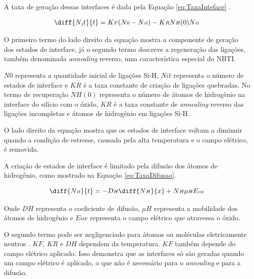 A taxa de geração dessas interfaces é dada pela Equação \ref{eq:TaxaInteface} \cite{Lorenz}.

\begin{equation}
    \label{eq:TaxaInteface}
    \diff{N{\textsubscript it}}{t} = K{\scriptstyle F}(N{\scriptstyle 0} - N{\scriptstyle it}) - K{\scriptstyle R}N{\scriptstyle H}(0)N{\scriptstyle it}
\end{equation}

O primeiro termo do lado direito da equação mostra a componente de geração dos estados de interface, já o segundo termo descreve a regeneração das ligações, também denominada \textit{annealing} reverso, uma característica especial do NBTI.

$N\scriptstyle{0}$ representa a quantidade inicial de ligações Si-H, $N\scriptstyle{it}$ representa o número de estados de interface e $K\scriptstyle{R}$ é a taxa constante de criação de ligações quebradas. No termo de recuperação $N\scriptstyle{H}(0)$ representa o número de átomos de hidrogênio na interface do silício com o óxido, $K\scriptstyle{R}$ é a taxa constante de \textit{annealing} reverso das ligações incompletas e átomos de hidrogênio em ligações Si-H.

O lado direito da equação mostra que os estados de interface voltam a diminuir quando a condição de estresse, causada pela alta temperatura e o campo elétrico, é removida.

A criação de estados de interface é limitado pela difusão dos átomos de hidrogênio, como mostrado na Equação \ref{eq:TaxaDifusao}.

\begin{equation}
    \label{eq:TaxaDifusao}
    \diff{N{\scriptstyle it}}{t} = - D{\scriptstyle H}\diff{N{\scriptstyle H}}{x} + N{\scriptstyle H}\mu{\scriptstyle H}E{\scriptstyle ox}
\end{equation}

Onde $D\scriptstyle{H}$ representa o coeficiente de difusão, $\mu\scriptstyle{H}$ representa a mobilidade dos átomos de hidrogênio e $E\scriptstyle{ox}$ representa o campo elétrico que atravessa o óxido.

O segundo termo pode ser negligenciado para átomos ou moléculas eletricamente neutros \cite{Lorenz}. $K\scriptstyle{F}$, $K\scriptstyle{R}$ e $D\scriptstyle{H}$ dependem da temperatura. $K\scriptstyle{F}$ também depende do campo elétrico aplicado. Isso demonstra que as interfaces só são geradas quando um campo elétrico é aplicado, o que não é necessário para o \textit{annealing} e para a difusão.

